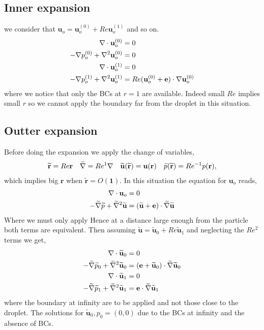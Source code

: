 \subsection{Inner expansion}
we consider that $\textbf{u}_o = \textbf{u}_o^{(0)} + Re \textbf{u}_o^{(1)}$ and so on.
\begin{align}
    \mathbf{\nabla}\cdot \textbf{u}_o^{(0)} &= 0
    \\
    -\mathbf{\nabla} p_o^{(0)} + \mathbf{\nabla}^2 \textbf{u}_o^{(0)}
    &= 0\\
    \mathbf{\nabla}\cdot \textbf{u}_o^{(1)} &= 0
    \\
    -\mathbf{\nabla} p_o^{(1)} + \mathbf{\nabla}^2 \textbf{u}_o^{(1)}
    &=
    Re  (\textbf{u}_o^{(0)} + \textbf{e})\cdot \mathbf{\nabla} \textbf{u}_o^{(0)}\\
\end{align}
where we notice that only the BCs at $r= 1$ are available.
Indeed small $Re$ implies small $r$ so we cannot apply the boundary far from the droplet in this situation.
\subsection{Outter expansion}
Before doing the expansion we apply the change of variables,
\begin{align}
    \widetilde{\textbf{r}} = Re \textbf{r}
    && \widetilde{\mathbf{\nabla}} = Re^{1} \mathbf{\nabla}
    && \widetilde{\textbf{u}}(\widetilde{\textbf{r}}) = \textbf{u}(\textbf{r})
    && \widetilde{p}(\widetilde{\textbf{r}}) = Re^{-1} p(\textbf{r}),
\end{align}
which implies big $\textbf{r}$ when $\widetilde{\textbf{r}} = O(\textbf{1})$.
In this situation the equation for $\textbf{u}_o$ reads,
\begin{align}
    \mathbf{\nabla}\cdot \textbf{u}_{o} &= 0
    \\
    - \widetilde{\mathbf{\nabla}} \widetilde{p} +  \widetilde{\mathbf{\nabla}}^2 \widetilde{\textbf{u}}
    &=
      (\widetilde{\textbf{u}} + \textbf{e})\cdot \widetilde{\mathbf{\nabla}} \widetilde{\textbf{u}}
\end{align}
Where we must only apply
Hence at a distance large enough from the particle both terms are equivalent.
Then assuming $\widetilde{\textbf{u}} = \widetilde{\textbf{u}}_0 + Re\widetilde{\textbf{u}}_1$ and neglecting the $Re^2$ terms we get,
\begin{align}
    \mathbf{\nabla}\cdot \widetilde{\textbf{u}}_0 &= 0
    \\
    - \widetilde{\mathbf{\nabla}} \widetilde{p}_0 +  \widetilde{\mathbf{\nabla}}^2 \widetilde{\textbf{u}}_0
    &=
     (\textbf{e}+ \widetilde{\textbf{u}}_0) \cdot \widetilde{\mathbf{\nabla}} \widetilde{\textbf{u}}_0\\
    \mathbf{\nabla}\cdot \widetilde{\textbf{u}}_1 &= 0
    \\
    - \widetilde{\mathbf{\nabla}} \widetilde{p}_1 +  \widetilde{\mathbf{\nabla}}^2 \widetilde{\textbf{u}}_1
    &=
     \textbf{e} \cdot \widetilde{\mathbf{\nabla}} \widetilde{\textbf{u}}_1
\end{align}
where the boundary at infinity are to be applied and not those close to the droplet.
The solutions for $\widetilde{\textbf{u}}_0, p_0 = (0,0)$ due to the BCs at infinity and the absence of BCs.
